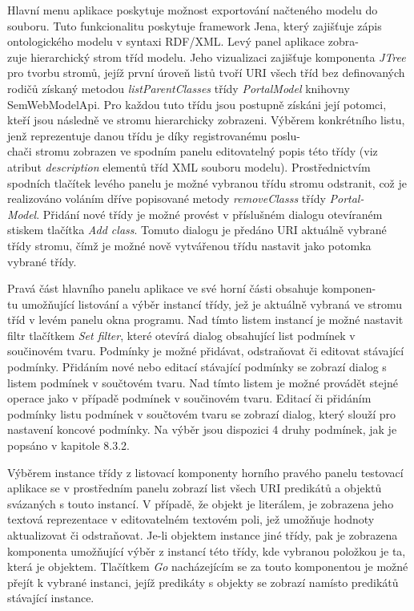 \documentclass{projekt}
\begin{document}
Hlavní menu aplikace poskytuje možnost exportování načteného modelu do souboru. Tuto funkcionalitu poskytuje framework Jena, který zajišťuje zápis ontologického modelu v syntaxi RDF/XML. Levý panel aplikace zobra-\\zuje hierarchický strom tříd modelu. Jeho vizualizaci zajišťuje komponenta {\it JTree} pro tvorbu stromů, jejíž první úroveň listů tvoří URI všech tříd bez definovaných rodičů získaný metodou {\it listParentClasses} třídy {\it PortalModel} knihovny SemWebModelApi. Pro každou tuto třídu jsou postupně získáni její potomci, kteří jsou následně ve stromu hierarchicky zobrazeni. Výběrem konkrétního listu, jenž reprezentuje danou třídu je díky registrovanému poslu-\\chači stromu zobrazen ve spodním panelu editovatelný popis této třídy (viz atribut {\it description} elementů tříd XML souboru modelu). Prostřednictvím spodních tlačítek levého panelu je možné vybranou třídu stromu odstranit, což je realizováno voláním dříve popisované metody {\it removeClasss} třídy {\it Portal-\\Model}. Přidání nové třídy je možné provést v příslušném dialogu otevíraném stiskem tlačítka {\it Add class}. Tomuto dialogu je předáno URI aktuálně vybrané třídy stromu, čímž je možné nově vytvářenou třídu nastavit jako potomka vybrané třídy.

Pravá část hlavního panelu aplikace ve své horní části obsahuje komponen-\\tu umožňující listování a výběr instancí třídy, jež je aktuálně vybraná ve stromu tříd v levém panelu okna programu. Nad tímto listem instancí je možné nastavit filtr tlačítkem {\it Set filter}, které otevírá dialog obsahující list podmínek v součinovém tvaru. Podmínky je možné přidávat, odstraňovat či editovat stávající podmínky. Přidáním nové nebo editací stávající podmínky se zobrazí dialog s listem podmínek v součtovém tvaru. Nad tímto listem je možné provádět stejné operace jako v případě podmínek v součinovém tvaru. Editací či přidáním podmínky listu podmínek v součtovém tvaru se zobrazí dialog, který slouží pro nastavení koncové podmínky. Na výběr jsou dispozici 4 druhy podmínek, jak je popsáno v kapitole 8.3.2.


Výběrem instance třídy z listovací komponenty horního pravého panelu testovací aplikace se v prostředním panelu zobrazí list všech URI predikátů a objektů svázaných s touto instancí. V případě, že objekt je literálem, je zobrazena jeho textová reprezentace v editovatelném textovém poli, jež umožňuje hodnoty aktualizovat či odstraňovat. Je-li objektem instance jiné třídy, pak je zobrazena komponenta umožňující výběr z instancí této třídy, kde vybranou položkou je ta, která je objektem. Tlačítkem {\it Go} nacházejícím se za touto komponentou je možné přejít k vybrané instanci, jejíž predikáty s objekty se zobrazí namísto predikátů stávající instance.
\end{document}
